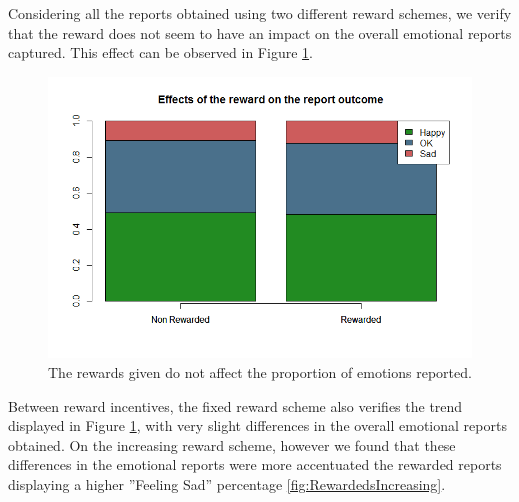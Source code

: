 \documentclass[letterpaper]{article}
\begin{document}
Considering all the reports obtained using two different reward schemes, we verify that the reward does not seem to have an impact on the overall emotional reports captured. This effect can be observed in Figure \ref{fig:RewardedvsNonRewarded}.
 
\begin{figure}[htb]
	\begin{center}
		\includegraphics[width=1\linewidth]{images/RewardedvsNonRewarded}
		\caption{The rewards given do not affect the proportion of emotions reported.\label{fig:RewardedvsNonRewarded}}
	\end{center}
\end{figure}

Between reward incentives, the fixed reward scheme also verifies the trend displayed in Figure \ref{fig:RewardedvsNonRewarded}, with very slight differences in the overall emotional reports obtained. On the increasing reward scheme, however we found that these differences in the emotional reports were more accentuated the rewarded reports displaying a higher ''Feeling Sad'' percentage \ref{fig:RewardedsIncreasing}.
\end{document}
